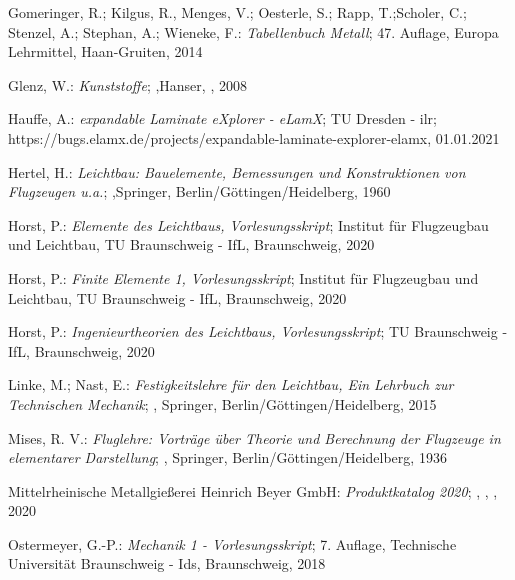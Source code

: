 \begingroup
\renewcommand{\section}[2]{}%
\begin{thebibliography}{99}  
	
	
	Gomeringer, R.; Kilgus, R., Menges, V.; Oesterle, S.; Rapp, T.;Scholer, C.; Stenzel, A.; Stephan, A.; Wieneke, F.:
	\textit{\glqq Tabellenbuch Metall\grqq};
	47. Auflage, Europa Lehrmittel, Haan-Gruiten, 2014 
	
	Glenz, W.:
	\textit{\glqq Kunststoffe\grqq};
	,Hanser, , 2008
	
	Hauffe, A.:
	\textit{\glqq expandable Laminate eXplorer - eLamX\grqq};
	TU Dresden - ilr; https://bugs.elamx.de/projects/expandable-laminate-explorer-elamx, 01.01.2021
	
	Hertel, H.:
	\textit{\glqq Leichtbau: Bauelemente, Bemessungen und Konstruktionen von Flugzeugen u.a.\grqq};
	,Springer, Berlin/Göttingen/Heidelberg, 1960 
	
	Horst, P.:
	\textit{\glqq Elemente des Leichtbaus, Vorlesungsskript\grqq};
	Institut für Flugzeugbau und Leichtbau, TU Braunschweig - IfL, Braunschweig, 2020 
	
	Horst, P.:
	\textit{\glqq Finite Elemente 1, Vorlesungsskript\grqq};
	Institut für Flugzeugbau und Leichtbau, TU Braunschweig  - IfL, Braunschweig, 2020 
	
	Horst, P.:
	\textit{\glqq Ingenieurtheorien des Leichtbaus, Vorlesungsskript\grqq};
	 TU Braunschweig - IfL, Braunschweig, 2020 
	
	Linke, M.; Nast, E.:
	\textit{\glqq Festigkeitslehre für den Leichtbau, Ein Lehrbuch zur Technischen Mechanik\grqq};
	, Springer, Berlin/Göttingen/Heidelberg, 2015
	
	Mises, R. V.:
	\textit{\glqq Fluglehre: Vorträge über Theorie und Berechnung der Flugzeuge in elementarer Darstellung\grqq};
	, Springer, Berlin/Göttingen/Heidelberg, 1936
	
	Mittelrheinische Metallgießerei Heinrich Beyer GmbH:
	\textit{\glqq Produktkatalog 2020\grqq};
	, , , 2020
	
	Ostermeyer, G.-P.:
	\textit{\glqq Mechanik 1 - Vorlesungsskript\grqq};
	7. Auflage, Technische Universität Braunschweig - Ids, Braunschweig, 2018 
	

\end{thebibliography}
